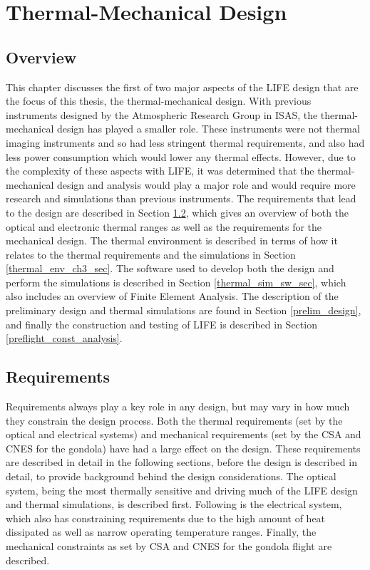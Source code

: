 \chapter{Thermal-Mechanical Design}  \label{thermal}

\section{Overview}
This chapter discusses the first of two major aspects of the LIFE design that are the focus of this thesis, the thermal-mechanical design. With previous instruments designed by the Atmospheric Research Group in ISAS, the thermal-mechanical design has played a smaller role. These instruments were not thermal imaging instruments and so had less stringent thermal requirements, and also had less power consumption which would lower any thermal effects. However, due to the complexity of these aspects with LIFE, it was determined that the thermal-mechanical design and analysis would play a major role and would require more research and simulations than previous instruments. The requirements that lead to the design are described in Section \ref{thermal_req_section}, which gives an overview of both the optical and electronic thermal ranges as well as the requirements for the mechanical design. The thermal environment is described in terms of how it relates to the thermal requirements and the simulations in Section \ref{thermal_env_ch3_sec}. The software used to develop both the design and perform the simulations is described in Section \ref{thermal_sim_sw_sec}, which also includes an overview of Finite Element Analysis. The description of the preliminary design and thermal simulations are found in Section \ref{prelim_design}, and finally the construction and testing of LIFE is described in Section \ref{preflight_const_analysis}.

\section{Requirements}\label{thermal_req_section}
Requirements always play a key role in any design, but may vary in how much they constrain the design process. Both the thermal requirements (set by the optical and electrical systems) and mechanical requirements (set by the CSA and CNES for the gondola) have had a large effect on the design. These requirements are described in detail in the following sections, before the design is described in detail, to provide background behind the design considerations. The optical system, being the most thermally sensitive and driving much of the LIFE design and thermal simulations, is described first. Following is the electrical system, which also has constraining requirements due to the high amount of heat dissipated as well as narrow operating temperature ranges. Finally, the mechanical constraints as set by CSA and CNES for the gondola flight are described.


